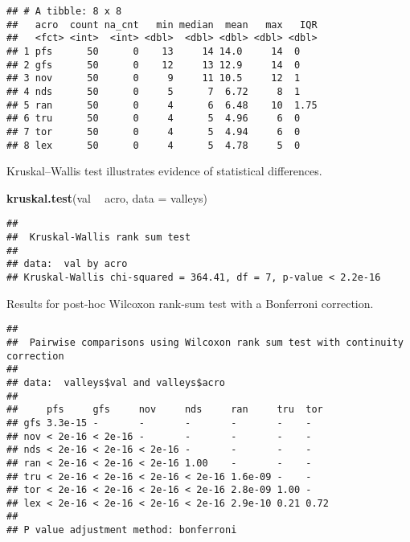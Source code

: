 \documentclass[]{book}
\newenvironment{Shaded}{\begin{snugshade}}{\end{snugshade}}
\newcommand{\DataTypeTok}[1]{\textcolor[rgb]{0.13,0.29,0.53}{#1}}
\newcommand{\KeywordTok}[1]{\textcolor[rgb]{0.13,0.29,0.53}{\textbf{#1}}}
\newcommand{\NormalTok}[1]{#1}
\newcommand{\OperatorTok}[1]{\textcolor[rgb]{0.81,0.36,0.00}{\textbf{#1}}}
\newcommand{\OtherTok}[1]{\textcolor[rgb]{0.56,0.35,0.01}{#1}}
\newcommand{\StringTok}[1]{\textcolor[rgb]{0.31,0.60,0.02}{#1}}
\begin{document}
\begin{verbatim}
## # A tibble: 8 x 8
##   acro  count na_cnt   min median  mean   max   IQR
##   <fct> <int>  <int> <dbl>  <dbl> <dbl> <dbl> <dbl>
## 1 pfs      50      0    13     14 14.0     14  0   
## 2 gfs      50      0    12     13 12.9     14  0   
## 3 nov      50      0     9     11 10.5     12  1   
## 4 nds      50      0     5      7  6.72     8  1   
## 5 ran      50      0     4      6  6.48    10  1.75
## 6 tru      50      0     4      5  4.96     6  0   
## 7 tor      50      0     4      5  4.94     6  0   
## 8 lex      50      0     4      5  4.78     5  0
\end{verbatim}

Kruskal--Wallis test illustrates evidence of statistical differences.

\begin{Shaded}
\begin{Highlighting}[]
\KeywordTok{kruskal.test}\NormalTok{(val }\OperatorTok{~}\StringTok{ }\NormalTok{acro, }\DataTypeTok{data =}\NormalTok{ valleys)}
\end{Highlighting}
\end{Shaded}

\begin{verbatim}
## 
##  Kruskal-Wallis rank sum test
## 
## data:  val by acro
## Kruskal-Wallis chi-squared = 364.41, df = 7, p-value < 2.2e-16
\end{verbatim}

Results for post-hoc Wilcoxon rank-sum test with a Bonferroni correction.

\begin{Shaded}
\end{Shaded}

\begin{verbatim}
## 
##  Pairwise comparisons using Wilcoxon rank sum test with continuity correction 
## 
## data:  valleys$val and valleys$acro 
## 
##     pfs     gfs     nov     nds     ran     tru  tor 
## gfs 3.3e-15 -       -       -       -       -    -   
## nov < 2e-16 < 2e-16 -       -       -       -    -   
## nds < 2e-16 < 2e-16 < 2e-16 -       -       -    -   
## ran < 2e-16 < 2e-16 < 2e-16 1.00    -       -    -   
## tru < 2e-16 < 2e-16 < 2e-16 < 2e-16 1.6e-09 -    -   
## tor < 2e-16 < 2e-16 < 2e-16 < 2e-16 2.8e-09 1.00 -   
## lex < 2e-16 < 2e-16 < 2e-16 < 2e-16 2.9e-10 0.21 0.72
## 
## P value adjustment method: bonferroni
\end{verbatim}
\end{document}
